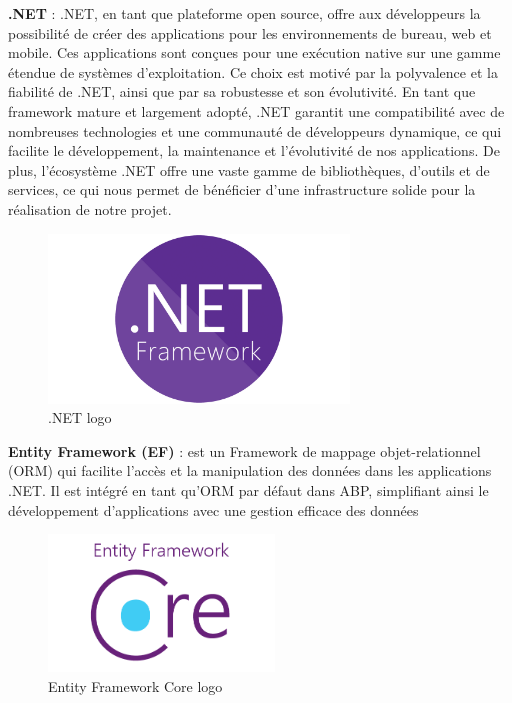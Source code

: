 \textbf{.NET} : .NET, en tant que plateforme open source, offre aux développeurs la possibilité de créer des applications pour les environnements de bureau, web et mobile. Ces applications sont conçues pour une exécution native sur une gamme étendue de systèmes d'exploitation. Ce choix est motivé par la polyvalence et la fiabilité de .NET, ainsi que par sa robustesse et son évolutivité. En tant que framework mature et largement adopté, .NET garantit une compatibilité avec de nombreuses technologies et une communauté de développeurs dynamique, ce qui facilite le développement, la maintenance et l'évolutivité de nos applications. De plus, l'écosystème .NET offre une vaste gamme de bibliothèques, d'outils et de services, ce qui nous permet de bénéficier d'une infrastructure solide pour la réalisation de notre projet.
\\
\begin{figure}[H] 
    \centering
    \includegraphics[width=8cm]{Figures/dotnet.png}
        \caption{.NET logo}
\end{figure}




\textbf{Entity Framework (EF)} : est un Framework de mappage objet-relationnel (ORM) qui facilite l'accès et la manipulation des données dans les applications .NET. Il est intégré en tant qu'ORM par défaut dans ABP, simplifiant ainsi le développement d'applications avec une gestion efficace des données
\\
\begin{figure}[H] 
    \centering
    \includegraphics[width=6cm]{Figures/efcore.png}
        \caption{Entity Framework Core logo}
\end{figure}


